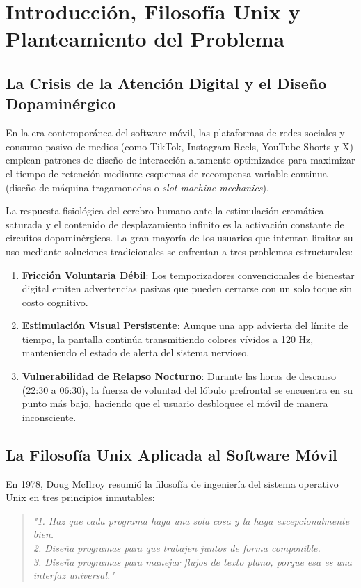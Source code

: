 \documentclass[11pt,a4paper,oneside]{report}
\begin{document}
\chapter[Introducción y Filosofía Unix]{Introducción, Filosofía Unix y Planteamiento del Problema}

\section{La Crisis de la Atención Digital y el Diseño Dopaminérgico}
En la era contemporánea del software móvil, las plataformas de redes sociales y consumo pasivo de medios (como TikTok, Instagram Reels, YouTube Shorts y X) emplean patrones de diseño de interacción altamente optimizados para maximizar el tiempo de retención mediante esquemas de recompensa variable continua (diseño de máquina tragamonedas o \textit{slot machine mechanics}). 

La respuesta fisiológica del cerebro humano ante la estimulación cromática saturada y el contenido de desplazamiento infinito es la activación constante de circuitos dopaminérgicos. La gran mayoría de los usuarios que intentan limitar su uso mediante soluciones tradicionales se enfrentan a tres problemas estructurales:
\begin{enumerate}
    \item \textbf{Fricción Voluntaria Débil}: Los temporizadores convencionales de bienestar digital emiten advertencias pasivas que pueden cerrarse con un solo toque sin costo cognitivo.
    \item \textbf{Estimulación Visual Persistente}: Aunque una app advierta del límite de tiempo, la pantalla continúa transmitiendo colores vívidos a 120 Hz, manteniendo el estado de alerta del sistema nervioso.
    \item \textbf{Vulnerabilidad de Relapso Nocturno}: Durante las horas de descanso (22:30 a 06:30), la fuerza de voluntad del lóbulo prefrontal se encuentra en su punto más bajo, haciendo que el usuario desbloquee el móvil de manera inconsciente.
\end{enumerate}

\section{La Filosofía Unix Aplicada al Software Móvil}
En 1978, Doug McIlroy resumió la filosofía de ingeniería del sistema operativo Unix en tres principios inmutables:
\begin{quote}
    \textit{"1. Haz que cada programa haga una sola cosa y la haga excepcionalmente bien.\\
    2. Diseña programas para que trabajen juntos de forma componible.\\
    3. Diseña programas para manejar flujos de texto plano, porque esa es una interfaz universal."}
\end{quote}
\end{document}
